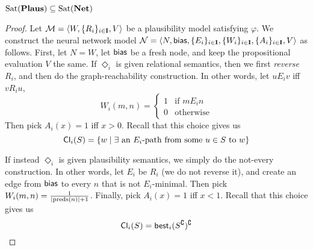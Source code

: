 \documentclass[letterpaper]{article}
\begin{document}
\begin{proposition}
    $\mathrm{Sat}( \textrm{\textbf{Plaus}} ) \subseteq \mathrm{Sat}( \textrm{\textbf{Net}} )$
\end{proposition}
\begin{proof}
    Let $\mathcal{M} = \langle W, \{ R_i \}_{i \in \textbf{I}}, V \rangle$ be a plausibility model satisfying $\varphi$.  We construct the neural network model $\mathcal{N} = \langle N, \mathsf{bias}, \{ E_i \}_{i \in \textbf{I}}, \{ W_i \}_{i \in \textbf{I}}, \{ A_i \}_{i \in \textbf{I}}, V \rangle$ as follows.  First, let $N = W$, let $\mathsf{bias}$ be a fresh node, and keep the propositional evaluation $V$ the same.  If $\Diamond_i$ is given relational semantics, then we first \emph{reverse} $R_i$, and then do the graph-reachability construction.  In other words, let $u{E_i}v$ iff $v{R_i}u$, 
    \[
        W_i(m, n) = 
        \begin{cases}
            1 & \mbox{if } m{E_i}n \\
            0 & \mbox{otherwise}
        \end{cases}
    \]
    Then pick $A_i(x) = 1$ iff $x > 0$.  Recall that this choice gives us
    \[
        \mathsf{Cl}_i(S) = \{ w \mid \exists \mbox{ an } E_i\mbox{-path from some } u \in S \mbox{ to } w \}            
    \]

    If instead $\Diamond_i$ is given plausibility semantics, we simply do the not-every construction.  In other words, let $E_i$ be $R_i$ (we do not reverse it), and create an edge from $\mathsf{bias}$ to every $n$ that is not $E_i$-minimal.  Then pick $W_i(m, n) = \frac{1}{|\mathrm{preds}(n)|+1}$.  Finally, pick $A_i(x) = 1$ iff $x < 1$.  Recall that this choice gives us
    \[
        \mathsf{Cl}_i(S) = \mathsf{best}_i(S^\complement)^\complement
    \]
    

\end{proof}
\end{document}

